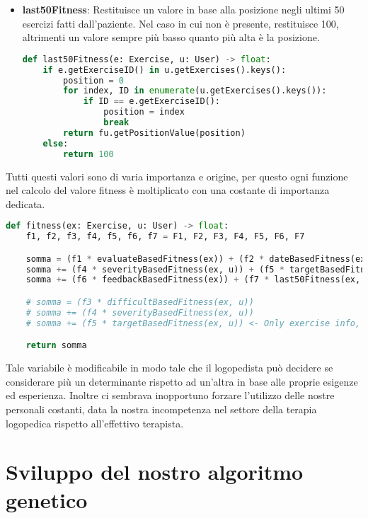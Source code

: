 \documentclass{article}
\begin{document}
\begin{itemize}
\item\textbf{last50Fitness}: Restituisce un valore in base alla posizione negli ultimi 50 esercizi fatti dall'paziente. Nel caso in cui non è presente, restituisce 100, altrimenti un valore sempre più basso quanto più alta è la posizione.
\begin{lstlisting}[language = Python]
    def last50Fitness(e: Exercise, u: User) -> float:
    if e.getExerciseID() in u.getExercises().keys():
        position = 0
        for index, ID in enumerate(u.getExercises().keys()):
            if ID == e.getExerciseID():
                position = index
                break
        return fu.getPositionValue(position)
    else:
        return 100
\end{lstlisting}
\end{itemize}

\pagebreak

Tutti questi valori sono di varia importanza e origine, per questo ogni funzione nel calcolo del valore fitness è moltiplicato con una costante di importanza dedicata.
\begin{lstlisting}[language = Python]
    def fitness(ex: Exercise, u: User) -> float:
    f1, f2, f3, f4, f5, f6, f7 = F1, F2, F3, F4, F5, F6, F7

    somma = (f1 * evaluateBasedFitness(ex)) + (f2 * dateBasedFitness(ex, MDAYS)) + (f3 * difficultBasedFitness(ex, u))
    somma += (f4 * severityBasedFitness(ex, u)) + (f5 * targetBasedFitness(ex, u))
    somma += (f6 * feedbackBasedFitness(ex)) + (f7 * last50Fitness(ex, u))

    # somma = (f3 * difficultBasedFitness(ex, u))
    # somma += (f4 * severityBasedFitness(ex, u))
    # somma += (f5 * targetBasedFitness(ex, u)) <- Only exercise info, ignores executions from user

    return somma
\end{lstlisting}

Tale variabile è modificabile in modo tale che il logopedista può decidere se considerare più un determinante rispetto ad un'altra in base alle proprie esigenze ed esperienza. Inoltre ci sembrava inopportuno forzare l'utilizzo delle nostre personali costanti, data la nostra incompetenza nel settore della terapia logopedica rispetto all'effettivo terapista.

\pagebreak


\section{Sviluppo del nostro algoritmo genetico}
\end{document}
